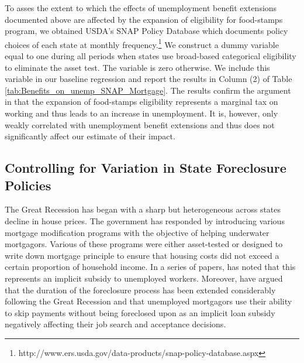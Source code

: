 \documentclass[12pt]{article}
\newcommand{\1}{\mathbf{1}}
\begin{document}
\begin{appendix}
To asses the extent to which the effects of unemployment benefit extensions documented above are affected by the expansion of eligibility for food-stamps program, we obtained USDA's SNAP Policy Database which documents policy choices of each state at monthly frequency.\footnote{http://www.ers.usda.gov/data-products/snap-policy-database.aspx} We construct a dummy variable equal to one during all periods when states use broad-based categorical eligibility to eliminate the asset test. The variable is zero otherwise. We include this variable in our baseline regression and report the results in Column (2) of Table \ref{tab:Benefits_on_unemp_SNAP_Mortgage}. The results confirm the argument in \citet{mulligan:12} that the expansion of food-stamps eligibility represents a marginal tax on working and thus leads to an increase in unemployment. It is, however, only weakly correlated with unemployment benefit extensions and thus does not significantly affect our estimate of their impact.



\begin{table}[t]
\centering
   \caption{Controlling for State SNAP and Foreclosure Policies }\label{tab:Benefits_on_unemp_SNAP_Mortgage}
\small

\vspace{-0.2cm}
\end{table}


\subsection{Controlling for Variation in State Foreclosure Policies}

The Great Recession has began with a sharp but heterogeneous across states decline in house prices. The government has responded by introducing various mortgage modification programs with the objective of helping underwater mortgagors. Various of these programs were either asset-tested or designed to write down mortgage principle to ensure that housing costs did not exceed a certain proportion of household income. In a series of papers, \citet{mulligan:08, mulligan:09, mulligan:10} has noted that this represents an implicit subsidy to unemployed workers. Moreover, \citet{herkenhoff+ohanian:13} have argued that the duration of the foreclosure process has been extended considerably following the Great Recession and that unemployed mortgagors use their ability to skip payments without being foreclosed upon as an implicit loan subsidy negatively affecting their job search and acceptance decisions.



\end{appendix}
\end{document}
